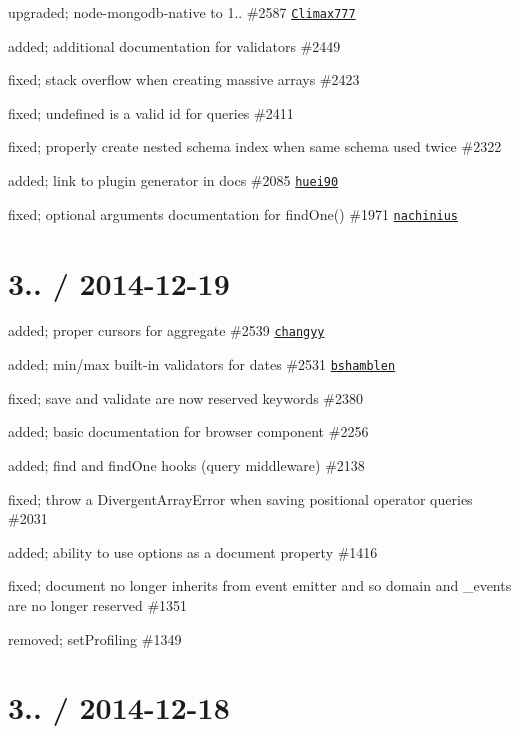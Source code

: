 \begin{DoxyItemize}
\item upgraded; node-\/mongodb-\/native to 1.. \#2587 \href{https://github.com/Climax777}{\tt Climax777}
\item added; additional documentation for validators \#2449
\item fixed; stack overflow when creating massive arrays \#2423
\item fixed; undefined is a valid id for queries \#2411
\item fixed; properly create nested schema index when same schema used twice \#2322
\item added; link to plugin generator in docs \#2085 \href{https://github.com/huei90}{\tt huei90}
\item fixed; optional arguments documentation for find\+One() \#1971 \href{https://github.com/nachinius}{\tt nachinius}
\end{DoxyItemize}

\section*{3.. / 2014-\/12-\/19 }


\begin{DoxyItemize}
\item added; proper cursors for aggregate \#2539 \href{https://github.com/changyy}{\tt changyy}
\item added; min/max built-\/in validators for dates \#2531 \href{https://github.com/bshamblen}{\tt bshamblen}
\item fixed; save and validate are now reserved keywords \#2380
\item added; basic documentation for browser component \#2256
\item added; find and find\+One hooks (query middleware) \#2138
\item fixed; throw a Divergent\+Array\+Error when saving positional operator queries \#2031
\item added; ability to use options as a document property \#1416
\item fixed; document no longer inherits from event emitter and so domain and \+\_\+events are no longer reserved \#1351
\item removed; set\+Profiling \#1349
\end{DoxyItemize}

\section*{3.. / 2014-\/12-\/18 }


